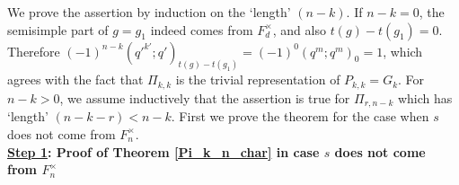 \documentclass[reqno]{amsart}
\theoremstyle{definition}
\theoremstyle{remark}
\numberwithin{equation}{section}
\begin{document}
We prove the assertion by induction on the `length' $(n-k)$. If $n-k=0$, the semisimple part of $g=g_1$ indeed comes from $F_d^\times$,  and also  $t(g)-t(g_1)=0$. Therefore $(-1)^{n-k} ({q'}^{k'};q')_{t(g)-t(g_1)}=(-1)^0(q^m;q^m)_0 = 1$, which agrees with the fact that $\Pi_{k,k}$ is the trivial representation of $P_{k,k}=G_k$.
For $n-k>0$, we assume inductively that the assertion is true for $\Pi_{r,n-k}$ which has `length' $(n-k-r) <n-k$. First we prove the theorem for the case 
when $s$ does not come from $F_n^\times$.  \\

\noindent\textbf{\underline{Step 1}: Proof of Theorem \ref{Pi_k_n_char} in  case  $s$ does not come from $F_n^\times$} \hfill \\

\end{document}
